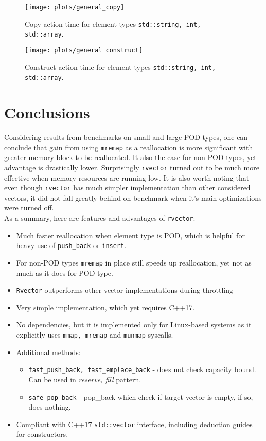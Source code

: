 \documentclass[inz, english, shortabstract]{iithesis}
\begin{document}
\begin{figure}[h!]
\texttt{[image: plots/general\_copy]}
\caption{Copy action time for element types \lstinline{std::string, int, std::array}.}
\label{general_copy}
\end{figure}

\begin{figure}[h!]
\texttt{[image: plots/general\_construct]}
\caption{Construct action time for element types \lstinline{std::string, int, std::array}.}
\label{general_construct}
\end{figure}

\chapter{Conclusions}
Considering results from benchmarks on small and large POD types, one can conclude that gain from using {\tt mremap} as a reallocation is more significant with greater memory block to be reallocated. It also the case for non-POD types, yet advantage is drastically lower. Surprisingly {\tt rvector} turned out to be much more effective when memory resources are running low. It is also worth noting that even though {\tt rvector} has much simpler implementation than other considered vectors, it did not fall greatly behind on benchmark when it's main optimizations were turned off.
\\
As a summary, here are features and advantages of {\tt rvector}:
\begin{itemize}
\item Much faster reallocation when element type is POD, which is helpful for heavy use of {\tt push\_back} or {\tt insert}.
\item For non-POD types {\tt mremap} in place still speeds up reallocation, yet not as much as it does for POD type.
\item {\tt Rvector} outperforms other vector implementations during throttling
\item Very simple implementation, which yet requires C++17.
\item No dependencies, but it is implemented only for Linux-based systems as it explicitly uses {\tt mmap, mremap} and {\tt munmap} syscalls.
\item Additional methods:
	\begin{itemize}
	\item {\tt fast\_push\_back, fast\_emplace\_back} - does not check capacity bound. Can be used in \emph{reserve, fill} pattern.
	\item {\tt safe\_pop\_back} - pop\_back which check if target vector is empty, if so, does nothing.
	\end{itemize}
\item Compliant with C++17 {\tt std::vector} interface, including deduction guides for constructors.
\end{itemize}
\end{document}
